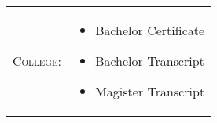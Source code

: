 %
%

\renewcommand{\arraystretch}{1.1}

\begin{tabular}{>{}r>{}p{13cm}}
    \textsc{College:} &
        \begin{itemize}
            \item Bachelor Certificate
            \item Bachelor Transcript
            \item Magister Transcript
        \end{itemize} \\
\end{tabular}







